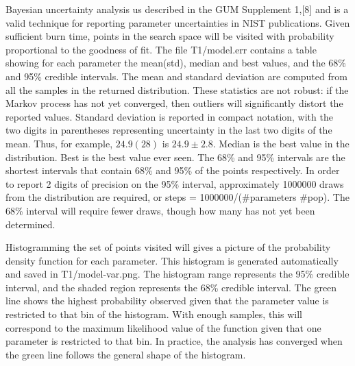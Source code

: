 \documentclass[letterpaper,10pt,english]{sphinxmanual}
\begin{document}
Bayesian uncertainty analysis us described in the GUM Supplement 1,{[}8{]}
and is a valid technique for reporting parameter uncertainties in NIST
publications.   Given sufficient burn time, points in the search space
will be visited with probability proportional to the goodness of fit.
The file T1/model.err contains a table showing for each
parameter the mean(std), median and best values, and the 68\% and 95\%
credible intervals.  The mean and standard deviation are computed from
all the samples in the returned distribution.  These statistics are not
robust: if the Markov process has not yet converged, then outliers will
significantly distort the reported values.  Standard deviation is
reported in compact notation, with the two digits in parentheses
representing uncertainty in the last two digits of the mean.  Thus, for
example, $24.9(28)$ is $24.9 \pm 2.8$.  Median is the best value in the
distribution.  Best is the best value ever seen.  The 68\% and 95\%
intervals are the shortest intervals that contain 68\% and 95\% of
the points respectively.  In order to report 2 digits of precision on
the 95\% interval, approximately 1000000 draws from the distribution
are required, or steps = 1000000/(\#parameters  \#pop).  The 68\% interval
will require fewer draws, though how many has not yet been determined.


Histogramming the set of points visited will gives a picture of the
probability density function for each parameter.  This histogram is
generated automatically and saved in T1/model-var.png.  The histogram
range represents the 95\% credible interval, and the shaded region
represents the 68\% credible interval.  The green line shows the highest
probability observed given that the parameter value is restricted to
that bin of the histogram.  With enough samples, this will correspond
to the maximum likelihood value of the function given that one parameter
is restricted to that bin.  In practice, the analysis has converged
when the green line follows the general shape of the histogram.
\end{document}
